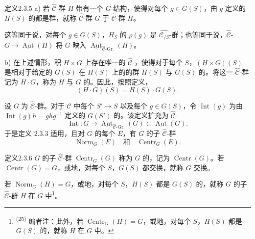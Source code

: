 \begin{SGAresult}{定义}{2.3.5}
a) 若 $\widehat{\mathcal C}$-群 $H$ 带有一个 $G$-结构，使得对每个 $g\in G(S)$，由 $g$ 定义的 $H(S)$ 的都是群，就称 $\widehat{\mathcal C}$-群 $G$ 于 $\widehat{\mathcal C}$-群 $H$。

这等同于说，对每个 $g\in G(S)$，$H_S$ 的 $\rho(g)$ 是 $\widehat{\mathcal C_{/S}}$-群；也等同于说，$\widehat{\mathcal C}$- $G\to\underline{\operatorname{Aut}}(H)$ 将 $G$ 映入 $\underline{\operatorname{Aut}}_{\widehat{\mathcal C}\text{-}\mathrm{Gr.}}(H)$。

b) 在上述情形，积 $H\times G$ 上存在唯一的 $\widehat{\mathcal C}$-，使得对于每个 $S$，$(H\times G)(S)$ 是相对于给定的 $G(S)$ 在 $H(S)$ 上的的群 $H(S)$ 与 $G(S)$ 的。将这一 $\widehat{\mathcal C}$-群记为 $H\cdot G$，称为 $H$ 与 $G$ 的。因此，按照定义，
\[
(H\cdot G)(S)=H(S)\cdot G(S).
\]
\end{SGAresult}
设 $G$ 为 $\widehat{\mathcal C}$-群。对于 $\mathcal C$ 中每个 $S'\to S$ 以及每个 $g\in G(S)$，令 $\operatorname{Int}(g)$ 为由 $\operatorname{Int}(g)h=ghg^{-1}$ 定义的 $G(S')$ 的。该定义扩充为 $\widehat{\mathcal C}$-
\[
\operatorname{Int}:G\longrightarrow\underline{\operatorname{Aut}}_{\widehat{\mathcal C}\text{-}\mathrm{Gr.}}(G)\subset\underline{\operatorname{Aut}}(G).
\]
于是定义 2.3.3 适用，且对 $G$ 的每个 $E$，有 $G$ 的子 $\widehat{\mathcal C}$-群
\[
\operatorname{Norm}_G(E)\quad\text{和}\quad\operatorname{Centr}_G(E).
\]
\begin{SGAresult}{定义}{2.3.6}
$G$ 的子 $\widehat{\mathcal C}$-群 $\operatorname{Centr}_G(G)$ 称为 $G$ 的，记为 $\operatorname{Centr}(G)$。若 $\operatorname{Centr}(G)=G$，或地，对每个 $S$，$G(S)$ 都交换，就称 $G$ 交换。

若 $\operatorname{Norm}_G(H)=G$，或地，对每个 $S$，$H(S)$ 都是 $G(S)$ 的，就称 $G$ 的子 $\widehat{\mathcal C}$-群 $H$ 在 $G$ 中\footnote{\textsuperscript{(25)} 编者注：此外，若 $\operatorname{Centr}_G(H)=G$，或地，对每个 $S$，$H(S)$ 都是 $G(S)$ 的，就称 $H$ 在 $G$ 中。}。
\end{SGAresult}
